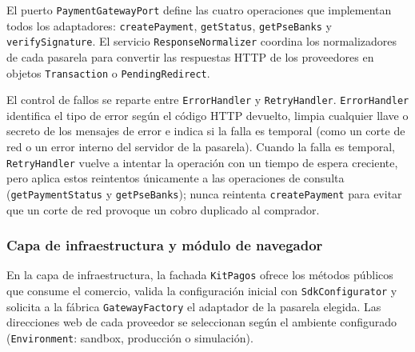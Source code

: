 El puerto \texttt{PaymentGatewayPort} define las cuatro operaciones que implementan todos los adaptadores: \texttt{createPayment}, \texttt{getStatus}, \texttt{getPseBanks} y \texttt{verifySignature}. El servicio \texttt{ResponseNormalizer} coordina los normalizadores de cada pasarela para convertir las respuestas HTTP de los proveedores en objetos \texttt{Transaction} o \texttt{PendingRedirect}.

El control de fallos se reparte entre \texttt{ErrorHandler} y \texttt{RetryHandler}. \texttt{ErrorHandler} identifica el tipo de error según el código HTTP devuelto, limpia cualquier llave o secreto de los mensajes de error e indica si la falla es temporal (como un corte de red o un error interno del servidor de la pasarela). Cuando la falla es temporal, \texttt{RetryHandler} vuelve a intentar la operación con un tiempo de espera creciente, pero aplica estos reintentos únicamente a las operaciones de consulta (\texttt{getPaymentStatus} y \texttt{getPseBanks}); nunca reintenta \texttt{createPayment} para evitar que un corte de red provoque un cobro duplicado al comprador.

\subsubsection{Capa de infraestructura y módulo de navegador}

En la capa de infraestructura, la fachada \texttt{KitPagos} ofrece los métodos públicos que consume el comercio, valida la configuración inicial con \texttt{SdkConfigurator} y solicita a la fábrica \texttt{GatewayFactory} el adaptador de la pasarela elegida. Las direcciones web de cada proveedor se seleccionan según el ambiente configurado (\texttt{Environment}: sandbox, producción o simulación).

